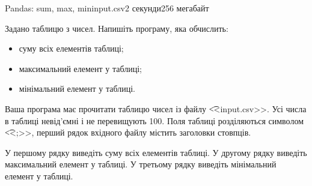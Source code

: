 \begin{problem}{Pandas: sum, max, min}{input.csv}{}{2 секунди}{256 мегабайт}

Задано таблицю з чисел. 
Напишіть програму, яка обчислить:
\begin{itemize} 
\item суму всіх елементів таблиці;
\item максимальний елемент у таблиці;
\item мінімальний елемент у таблиці.
\end{itemize}

\InputFile
Ваша програма має прочитати таблицю чисел із файлу {\t {<<input.csv>>}}.
Усі числа в таблиці невід'ємні і не перевищують 100.
Поля таблиці розділяються символом {\t{<<;>>}}, перший рядок вхідного файлу містить заголовки стовпців.

\OutputFile
У першому рядку виведіть суму всіх елементів таблиці.
У другому рядку виведіть максимальний елемент у таблиці.
У третьому рядку виведіть мінімальний елемент у таблиці.

\Example
\begin{example}
%
\end{example}

\end{problem}

